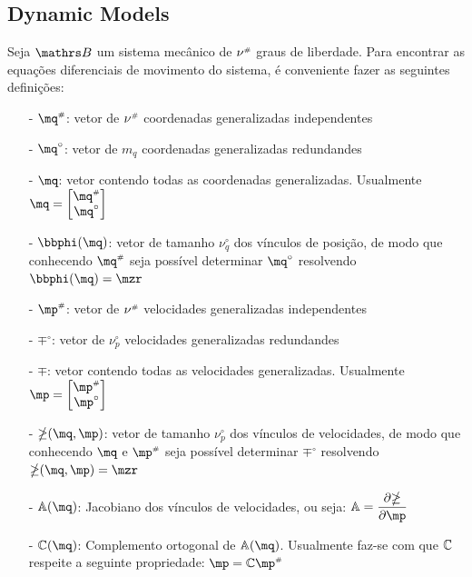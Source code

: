 \subsection{Dynamic Models}\label{S02-2}


Seja $\ssB$ um sistema mecânico de $\nu^{\scriptscriptstyle \#}$ graus de liberdade. Para encontrar as equações diferenciais de movimento do sistema, é conveniente fazer as seguintes definições:

\begin{itemize}
\item[-]$\mq\ssh$: vetor de $\nu^{\scriptscriptstyle \#}$ coordenadas generalizadas independentes
\item[-]$\mq^\circ$: vetor de $m_q$ coordenadas generalizadas redundandes
\item[-]$\mq$: vetor contendo todas as coordenadas generalizadas. Usualmente $\mq = \begin{bmatrix} \mq\ssh \\\mq^\circ \end{bmatrix} $
\item[-]$\mphi(\mq)$: vetor de tamanho $\nu_q^\circ$ dos vínculos de posição, de modo que conhecendo $\mq\ssh$ seja possível determinar $\mq^\circ$ resolvendo $\mphi(\mq) = \mzr$
\item[-]$\mp\ssh$: vetor de $\nu^{\scriptscriptstyle \#}$ velocidades generalizadas independentes
\item[-]$\mp^\circ$: vetor de $\nu_p^\circ$ velocidades generalizadas redundandes
\item[-]$\mp$: vetor contendo todas as velocidades generalizadas. Usualmente $\mp = \begin{bmatrix} \mp\ssh \\\mp^\circ \end{bmatrix} $
\item[-]$\mathbb{\Lambda(\mq,\mp)}$: vetor de tamanho $\nu_p^\circ$ dos vínculos de velocidades, de modo que conhecendo $\mq$ e $\mp\ssh$ seja possível determinar $\mp^\circ$ resolvendo $\mathbb{\Lambda} (\mq,\mp) = \mzr$
\item[-]$\mA(\mq)$: Jacobiano dos vínculos de velocidades, ou seja: $\mA = \displaystyle\frac{\partial \mathbb{\Lambda}}{\partial \mp}$
\item[-]$\mC(\mq)$: Complemento ortogonal de $\mA(\mq)$. Usualmente faz-se com que $\mathbb{C}$ respeite a seguinte propriedade: $ \mp = \mC \mp\ssh $
\end{itemize}

